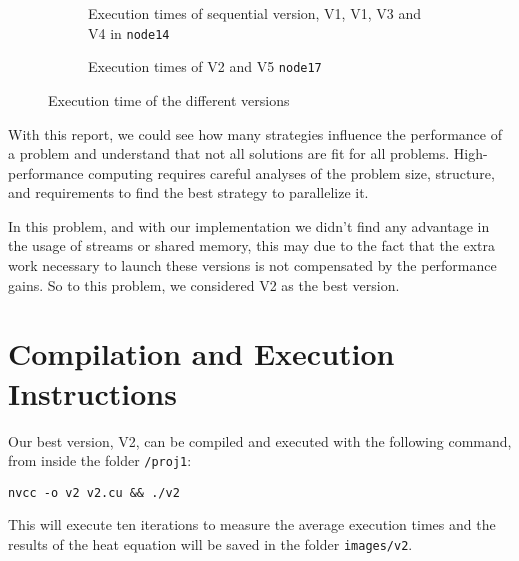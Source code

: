 \documentclass[conference]{IEEEtran}
\begin{document}
\begin{figure}[ht]
  \centering
\begin{subfigure}[b]{\columnwidth}


\caption{Execution times of sequential version, V1, V1, V3 and V4 in \texttt{node14}}
\label{fig:executionTimeCompareNode14}
  \end{subfigure}
\begin{subfigure}[b]{\columnwidth}
\caption{Execution times of V2 and V5  \texttt{node17}}
\label{fig:executionTimeCompareNode17}
\end{subfigure}
  \caption{Execution time of the different versions}
  \label{fig:executionTimeCompare}
\end{figure}

With this report, we could see how many strategies influence the performance of a problem and understand that not all solutions are fit for all problems. High-performance computing requires careful analyses of the problem size, structure, and requirements to find the best strategy to parallelize it.

In this problem, and with our implementation we didn't find any advantage in the usage of streams or shared memory, this may due to the fact that the extra work necessary to launch these versions is not compensated by the performance gains. So to this problem, we considered V2 as the best version.

\section{Compilation and Execution Instructions}
Our best version, V2, can be compiled and executed with the following command, from inside the folder \texttt{/proj1}:
\begin{verbatim}
nvcc -o v2 v2.cu && ./v2
\end{verbatim}
This will execute ten iterations to measure the average execution times and the results of the heat equation will be saved in the folder \texttt{images/v2}.


\printbibliography
\end{document}
